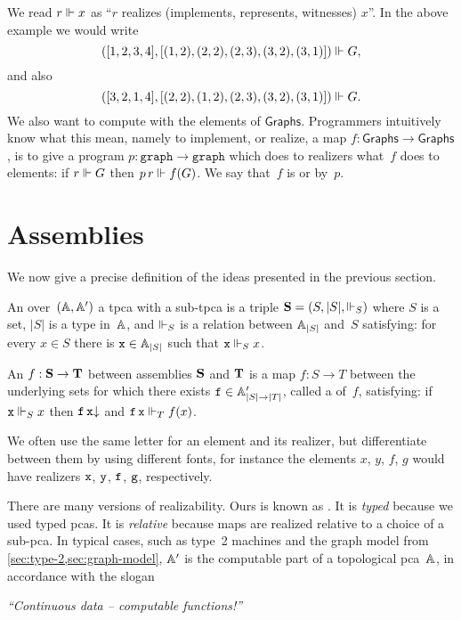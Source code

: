 %
We read $r \rz x$ as ``$r$ realizes (implements, represents, witnesses) $x$''. In the above example we would write
%
\begin{equation*}
([1, 2, 3, 4], [(1,2), (2,2), (2,3), (3,2), (3,1)]) \rz G,
\end{equation*}
%
and also
%
\begin{equation*}
([3, 2, 1, 4], [(2,2), (1,2), (2,3), (3,2), (3,1)]) \rz G.
\end{equation*}
%
We also want to compute with the elements of $\mathsf{Graphs}$.
%
Programmers intuitively know what this mean, namely to implement, or realize, a map $f : \mathsf{Graphs} \to \mathsf{Graphs}$, is to give a program $p : \mathtt{graph} \to \mathtt{graph}$ which does to realizers what~$f$ does to elements: if $r \rz G$ then $p \, r \rz f(G)$. We say that~$f$ is  or  by~$p$.

\section{Assemblies}
\label{sec:assemblies}

We now give a precise definition of the ideas presented in the previous section.

\begin{definition}
  An  over~$(\AA, \subAA)$ a tpca with a sub-tpca is a triple
  $\asm{S} = \xasm{S}$ where $S$ is a set, $|S|$ is a type in~$\AA$, and $\rz_S$ is a relation between $\xAtyp{S}$ and~$S$
  satisfying: for every $x \in S$ there is $\R{x} \in \xAtyp{S}$ such that $\R{x} \rz_S x$.

  An  $f : \asm{S} \to \asm{T}$ between assemblies $\asm{S}$ and $\asm{T}$ is a map $f : S \to T$
  between the underlying sets for which there exists $\R{f} \in \subAtyp{|S| \to |T|}$, called a 
  of~$f$, satisfying: if $\R{x} \rz_S x$ then $\defined{\R{f} \, \R{x}}$ and $\R{f} \, \R{x} \rz_T f(x)$.
\end{definition}

We often use the same letter for an element and its realizer, but differentiate between them by using different fonts, for instance the elements $x$, $y$, $f$, $g$ would have realizers $\R{x}$, $\R{y}$, $\R{f}$, $\R{g}$, respectively.

There are many versions of realizability. Ours is known as . It is \emph{typed}
because we used typed pcas. It is \emph{relative} because maps are realized relative to a choice of a sub-pca. In
typical cases, such as type~2 machines and the graph model from \cref{sec:type-2,sec:graph-model}, $\subAA$ is the
computable part of a topological pca~$\AA$, in accordance with the slogan
%
\begin{center}
  \emph{``Continuous data -- computable functions!''}
\end{center}

